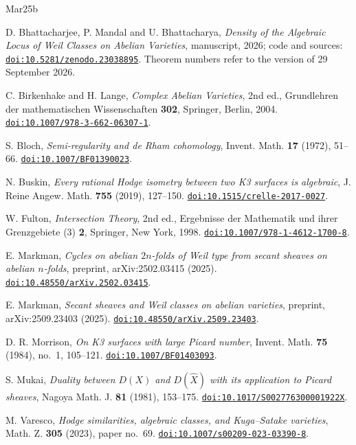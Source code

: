 \documentclass[11pt]{amsart}
\theoremstyle{definition}
\theoremstyle{remark}
\begin{document}
\begingroup\raggedright
\begin{thebibliography}{Mar25b}

D. Bhattacharjee, P. Mandal and U. Bhattacharya,
\emph{Density of the Algebraic Locus of Weil Classes on Abelian Varieties},
manuscript, 2026; code and sources:
\href{https://doi.org/10.5281/zenodo.23038895}{\texttt{doi:10.5281/zenodo.23038895}}.
Theorem numbers refer to the version of 29 September 2026.

C. Birkenhake and H. Lange,
\emph{Complex Abelian Varieties}, 2nd ed.,
Grundlehren der mathematischen Wissenschaften \textbf{302},
Springer, Berlin, 2004.
\href{https://doi.org/10.1007/978-3-662-06307-1}{\texttt{doi:10.1007/978-3-662-06307-1}}.

S. Bloch,
\emph{Semi-regularity and de Rham cohomology},
Invent. Math. \textbf{17} (1972), 51--66.
\href{https://doi.org/10.1007/BF01390023}{\texttt{doi:10.1007/BF01390023}}.

N. Buskin,
\emph{Every rational Hodge isometry between two K3 surfaces is algebraic},
J. Reine Angew. Math. \textbf{755} (2019), 127--150.
\href{https://doi.org/10.1515/crelle-2017-0027}{\texttt{doi:10.1515/crelle-2017-0027}}.

W. Fulton,
\emph{Intersection Theory}, 2nd ed.,
Ergebnisse der Mathematik und ihrer Grenzgebiete (3) \textbf{2},
Springer, New York, 1998.
\href{https://doi.org/10.1007/978-1-4612-1700-8}{\texttt{doi:10.1007/978-1-4612-1700-8}}.

E. Markman,
\emph{Cycles on abelian $2n$-folds of Weil type from secant sheaves on
abelian $n$-folds}, preprint, arXiv:2502.03415 (2025).
\href{https://doi.org/10.48550/arXiv.2502.03415}{\texttt{doi:10.48550/arXiv.2502.03415}}.

E. Markman,
\emph{Secant sheaves and Weil classes on abelian varieties},
preprint, arXiv:2509.23403 (2025).
\href{https://doi.org/10.48550/arXiv.2509.23403}{\texttt{doi:10.48550/arXiv.2509.23403}}.

D. R. Morrison,
\emph{On K3 surfaces with large Picard number},
Invent. Math. \textbf{75} (1984), no.~1, 105--121.
\href{https://doi.org/10.1007/BF01403093}{\texttt{doi:10.1007/BF01403093}}.

S. Mukai,
\emph{Duality between $D(X)$ and $D(\hat{X})$ with its application to
Picard sheaves},
Nagoya Math. J. \textbf{81} (1981), 153--175.
\href{https://doi.org/10.1017/S002776300001922X}{\texttt{doi:10.1017/S002776300001922X}}.

M. Varesco,
\emph{Hodge similarities, algebraic classes, and Kuga--Satake varieties},
Math. Z. \textbf{305} (2023), paper no.~69.
\href{https://doi.org/10.1007/s00209-023-03390-8}{\texttt{doi:10.1007/s00209-023-03390-8}}.

\end{thebibliography}
\endgroup
\end{document}
